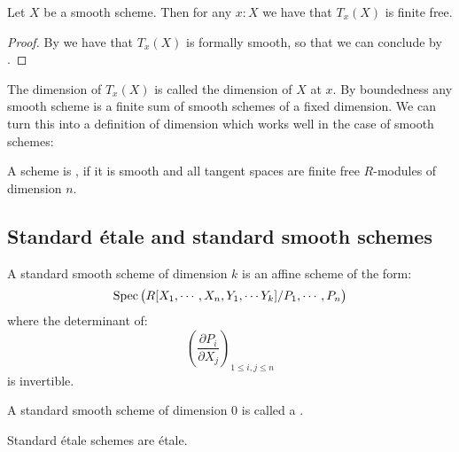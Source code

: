\begin{proposition}\label{smooth-have-free-tangent}
Let $X$ be a smooth scheme. Then for any $x:X$ we have that $T_x(X)$ is finite free.
\end{proposition}

\begin{proof}
By  we have that $T_x(X)$ is formally smooth, so that we can conclude by .
\end{proof}

The dimension of $T_x(X)$ is called the dimension of $X$ at $x$. By boundedness any smooth scheme is a finite sum of smooth schemes of a fixed dimension.
We can turn this into a definition of dimension which works well in the case of smooth schemes:

\begin{definition}
  \label{definition-smooth-dim-n}
  A scheme is , if it is smooth and all tangent spaces are finite free $R$-modules of dimension $n$.
\end{definition}

\subsection{Standard étale and standard smooth schemes}

\begin{definition}
A standard smooth scheme of dimension $k$ is an affine scheme of the form:
\[\operatorname{Spec}\big(R[X_1,\cdots,X_n,Y_1,\cdots Y_{k}] / P_1,\cdots,P_n\big)\]
where the determinant of:
\[\left( \frac{\partial P_i}{\partial X_j}\right)_{1\leq i,j\leq n}\]
is invertible.
\end{definition}

\begin{definition}
A standard smooth scheme of dimension $0$ is called a .
\end{definition}

\begin{lemma}\label{standard-etale-are-etale}
Standard étale schemes are étale.
\end{lemma}

